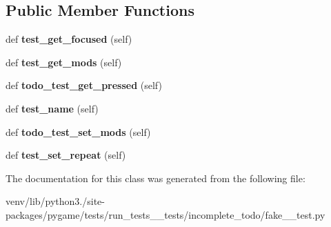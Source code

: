 \subsection*{Public Member Functions}
\begin{DoxyCompactItemize}
\item 
\mbox{\label{classpygame_1_1tests_1_1run__tests____tests_1_1incomplete__todo_1_1fake__2__test_1_1_key_module_test_ab30d2b418f19251fbc55966aa4e8d4f6}} 
def {\bfseries test\+\_\+get\+\_\+focused} (self)
\item 
\mbox{\label{classpygame_1_1tests_1_1run__tests____tests_1_1incomplete__todo_1_1fake__2__test_1_1_key_module_test_a6567832ec50d81e2c8de722d63b1a576}} 
def {\bfseries test\+\_\+get\+\_\+mods} (self)
\item 
\mbox{\label{classpygame_1_1tests_1_1run__tests____tests_1_1incomplete__todo_1_1fake__2__test_1_1_key_module_test_af3a90050d38263c038b65efcc526050e}} 
def {\bfseries todo\+\_\+test\+\_\+get\+\_\+pressed} (self)
\item 
\mbox{\label{classpygame_1_1tests_1_1run__tests____tests_1_1incomplete__todo_1_1fake__2__test_1_1_key_module_test_a685cb9739cb8802e9a2dddee0511f462}} 
def {\bfseries test\+\_\+name} (self)
\item 
\mbox{\label{classpygame_1_1tests_1_1run__tests____tests_1_1incomplete__todo_1_1fake__2__test_1_1_key_module_test_a2a7959ee03cc339e140afeb4dde3094a}} 
def {\bfseries todo\+\_\+test\+\_\+set\+\_\+mods} (self)
\item 
\mbox{\label{classpygame_1_1tests_1_1run__tests____tests_1_1incomplete__todo_1_1fake__2__test_1_1_key_module_test_a645a0c71357dc8df5123a2a03a6bb4fb}} 
def {\bfseries test\+\_\+set\+\_\+repeat} (self)
\end{DoxyCompactItemize}


The documentation for this class was generated from the following file\+:\begin{DoxyCompactItemize}
\item 
venv/lib/python3./site-\/packages/pygame/tests/run\+\_\+tests\+\_\+\+\_\+tests/incomplete\+\_\+todo/fake\+\_\+\_\+test.\+py\end{DoxyCompactItemize}
